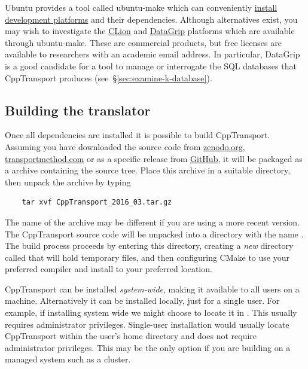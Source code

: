 \documentclass[11pt,a4paper]{article}
\renewcommand{\texttt}[1]{{\ttfamily\fontseries{l}\selectfont{#1}}}
\newcommand{\packagefont}{\sffamily}
\newcommand{\CppTransport}{{\packagefont CppTransport}}
\newcommand{\CLion}{{\packagefont CLion}}
\newcommand{\DataGrip}{{\packagefont DataGrip}}
\newcommand{\CMake}{{\packagefont CMake}}
\newcommand{\file}[1]{\texttt{{#1}}}
\begin{document}
Ubuntu provides a tool called ubuntu-make which can conveniently
\href{https://wiki.ubuntu.com/ubuntu-make}{install
development platforms} and their dependencies.
Although alternatives exist, you may wish to investigate the
\href{https://www.jetbrains.com/clion/}{\CLion}
and
\href{https://www.jetbrains.com/datagrip/}{\DataGrip}
platforms which are available through ubuntu-make.
These are commercial products, but free licenses are available
to researchers with an academic email address.
In particular, {\DataGrip} is a good candidate
for a tool to manage or interrogate the SQL databases that
{\CppTransport} produces (see~\S\ref{sec:examine-k-database}).

\subsection{Building the translator}
\label{sec:build-translator}

Once all dependencies are installed it is possible to build {\CppTransport}.
Assuming you have downloaded the source code
from \href{http://zenodo.org}{zenodo.org},
\href{http://transportmethod.com/cpptransport}{transportmethod.com}
or as a specific release from
\href{https://github.com/ds283/CppTransport/releases}{GitHub},
it will be packaged as a \file{.tar.gz} archive containing the source tree.
Place this archive in a suitable directory, then unpack the
archive by typing
\begin{verbatim}
	tar xvf CppTransport_2016_03.tar.gz
\end{verbatim}
The name of the archive may be different if you are using a more recent
version.
The {\CppTransport} source code will be unpacked into a directory
with the name \file{CppTransport}.
The build process proceeds by entering this directory,
creating a \emph{new} directory called
\file{build} that will hold temporary files,
and then configuring {\CMake} to use your preferred compiler
and install to your preferred location.

{\CppTransport} can be installed \emph{system-wide}, making it available
to all users on a machine. Alternatively it can be installed locally,
just for a single user. For example, if installing
system wide we might choose to locate it in \file{/usr/local}.
This usually requires administrator privileges.
Single-user installation would usually locate {\CppTransport} within the
user's home directory
and does not require administrator privileges. This may be the only option
if you are building on a managed system such as a cluster.
\end{document}
